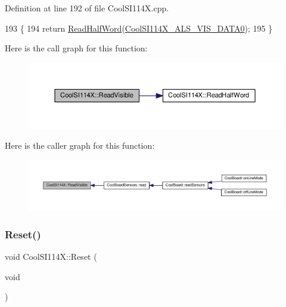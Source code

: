Definition at line 192 of file Cool\+S\+I114\+X.\+cpp.


\begin{DoxyCode}
193 \{
194   \textcolor{keywordflow}{return} \hyperlink{class_cool_s_i114_x_a1d25c9e137874af529804c2ec796a6b9}{ReadHalfWord}(\hyperlink{_cool_s_i114_x_8h_ad0be7e088d8a5fbf903067dc5ce87628}{CoolSI114X\_ALS\_VIS\_DATA0});    
195 \}
\end{DoxyCode}
Here is the call graph for this function\+:\nopagebreak
\begin{figure}[H]
\begin{center}
\leavevmode
\includegraphics[width=350pt]{dd/d67/class_cool_s_i114_x_a42e0e574256341443c647a4c0eda87d5_cgraph}
\end{center}
\end{figure}
Here is the caller graph for this function\+:\nopagebreak
\begin{figure}[H]
\begin{center}
\leavevmode
\includegraphics[width=350pt]{dd/d67/class_cool_s_i114_x_a42e0e574256341443c647a4c0eda87d5_icgraph}
\end{center}
\end{figure}
\mbox{\label{class_cool_s_i114_x_a9d9f9c9129c0c29ed497f8563f3dd823}} 
\subsubsection{\texorpdfstring{Reset()}{Reset()}}
{\footnotesize\ttfamily void Cool\+S\+I114\+X\+::\+Reset (\begin{DoxyParamCaption}\item[{void}]{ }\end{DoxyParamCaption})}



